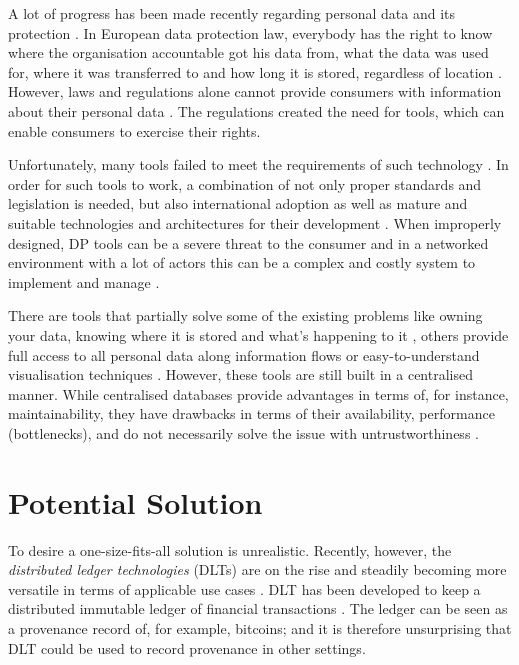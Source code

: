 A lot of progress has been made recently regarding personal data and its protection \cite{7_privacy_trends,ccpa,lgpd}. In European data protection law, everybody has the right to know where the organisation accountable got his data from, what the data was used for, where it was transferred to and how long it is stored, regardless of location \cite{gdpr_chap3}. However, laws and regulations alone cannot provide consumers with information about their personal data \cite{p3p_early_adopters}. The regulations created the need for tools, which can enable consumers to exercise their rights.

Unfortunately, many tools failed to meet the requirements of such technology \cite{TETs_survey,security_in_theway,DP_survey}. In order for such tools to work, a combination of not only proper standards and legislation is needed, but also international adoption as well as mature and suitable technologies and architectures for their development \cite{p3p_early_adopters}. When improperly designed, DP tools can be a severe threat to the consumer and in a networked environment with a lot of actors this can be a complex and costly system to implement and manage \cite{TETs_survey}.

There are tools that partially solve some of the existing problems like owning your data, knowing where it is stored and what's happening to it \cite{matomo}, others provide full access to all personal data along information flows \cite{bier2016privacyinsight} or easy-to-understand visualisation techniques \cite{comics}. However, these tools are still built in a centralised manner. While centralised databases provide advantages in terms of, for instance, maintainability, they have drawbacks in terms of their availability, performance (bottlenecks), and do not necessarily solve the issue with untrustworthiness \cite[p.~266-267]{dlt_1}.

\section{Potential Solution}
\label{sec:potentialsolution}

To desire a one-size-fits-all solution is unrealistic. Recently, however, the \textit{distributed ledger technologies} (DLTs) are on the rise and steadily becoming more versatile in terms of applicable use cases \cite{dlt_2}. DLT has been developed to keep a distributed immutable ledger of financial transactions \cite{dlt_1}. The ledger can be seen as a provenance record of, for example, bitcoins; and it is therefore unsurprising that DLT could be used to record provenance in other settings. 

